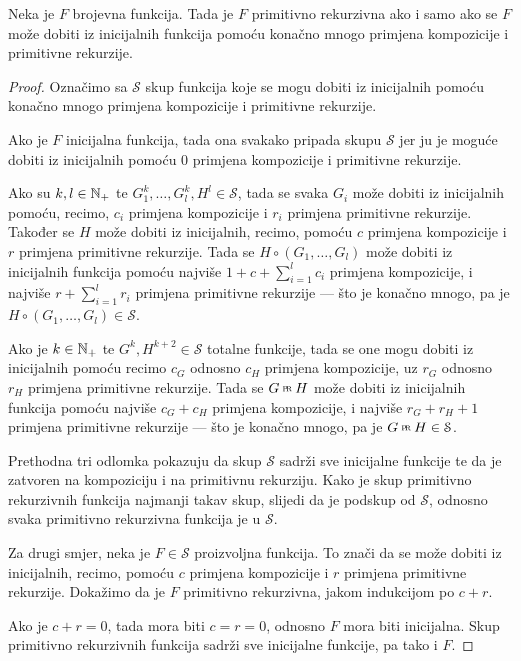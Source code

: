 \begin{propozicija}[{name=[simboličke definicije primitivno rekurzivnih funkcija]}]\label{prop:symbdef}
Neka je $F$ brojevna funkcija. Tada je $F$ primitivno rekurzivna ako i samo ako se $F$ može dobiti iz inicijalnih funkcija pomoću konačno mnogo primjena kompozicije i primitivne rekurzije.
\end{propozicija}
\begin{proof}
Označimo sa $\mathcal S$ skup funkcija koje se mogu dobiti iz inicijalnih pomoću ko\-nač\-no mnogo primjena kompozicije i primitivne rekurzije. 

	Ako je $F$ inicijalna funkcija, tada ona svakako pripada skupu $\mathcal S$ jer ju je moguće dobiti iz inicijalnih pomoću $0$ primjena kompozicije i primitivne rekurzije.

Ako su $k,l\in{\mathbb N}_+$ te $G_1^k,\dotsc,G_l^k,H^l\in\mathcal S$, tada se svaka $G_i$ može dobiti iz inicijalnih pomoću, recimo, $c_i$ primjena kompozicije i $r_i$ primjena primitivne rekurzije. Također se $H$ može dobiti iz inicijalnih, recimo, pomoću $c$ primjena kompozicije i $r$ primjena primitivne rekurzije. Tada se $H\circ(G_1,\dotsc,G_l)$ može dobiti iz inicijalnih funkcija pomoću najviše $1+c+\sum_{i=1}^lc_i$ primjena kompozicije, i najviše $r+\sum_{i=1}^lr_i$ primjena primitivne rekurzije --- što je konačno mnogo, pa je $H\circ(G_1,\dotsc,G_l)\in\mathcal S$.

Ako je $k\in{\mathbb N}_+$ te $G^k,H^{k+2}\in\mathcal S$ totalne funkcije, tada se one mogu dobiti iz inicijalnih pomoću recimo $c_G$ odnosno $c_H$ primjena kompozicije, uz $r_G$ odnosno $r_H$ primjena primitivne rekurzije. Tada se $G\pr H$ može dobiti iz inicijalnih funkcija pomoću najviše $c_G+c_H$ primjena kompozicije, i najviše $r_G+r_H+1$ primjena primitivne rekurzije --- što je konačno mnogo, pa je $G\pr H\in\mathcal S$.

Prethodna tri odlomka pokazuju da skup $\mathcal S$ sadrži sve inicijalne funkcije te da je zatvoren na kompoziciju i na primitivnu rekurziju. Kako je skup primitivno rekurzivnih funkcija najmanji takav skup, slijedi da je podskup od $\mathcal S$, odnosno svaka primitivno rekurzivna funkcija je u $\mathcal S$.

Za drugi smjer, neka je $F\in\mathcal S$ proizvoljna funkcija. To znači da se može dobiti iz inicijalnih, recimo, pomoću $c$ primjena kompozicije i $r$ primjena primitivne rekurzije. Dokažimo da je $F$ primitivno rekurzivna, jakom indukcijom po $c+r$.

Ako je $c+r=0$, tada mora biti $c=r=0$, odnosno $F$ mora biti inicijalna. Skup primitivno rekurzivnih funkcija sadrži sve inicijalne funkcije, pa tako i $F$.


\end{proof}
